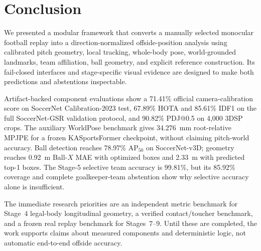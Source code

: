\documentclass[runningheads]{llncs}
\begin{document}
\section{Conclusion}
\label{sec:conclusion}

We presented a modular framework that converts a manually selected monocular football replay into a direction-normalized offside-position analysis using calibrated pitch geometry, local tracking, whole-body pose, world-grounded landmarks, team affiliation, ball geometry, and explicit reference construction. Its fail-closed interfaces and stage-specific visual evidence are designed to make both predictions and abstentions inspectable.

Artifact-backed component evaluations show a 71.41\% official camera-calibration score on SoccerNet Calibration-2023 test, 67.89\% HOTA and 85.61\% IDF1 on the full SoccerNet-GSR validation protocol, and 90.82\% PDJ@0.5 on 4,000 3DSP crops. The auxiliary WorldPose benchmark gives 34.276~mm root-relative MPJPE for a frozen KASportsFormer checkpoint, without claiming pitch-world accuracy. Ball detection reaches 78.97\% AP$_{50}$ on SoccerNet-v3D; geometry reaches 0.92~m Ball-$X$ MAE with optimized boxes and 2.33~m with predicted top-1 boxes. The Stage-5 selective team accuracy is 99.81\%, but its 85.92\% coverage and complete goalkeeper-team abstention show why selective accuracy alone is insufficient.

The immediate research priorities are an independent metric benchmark for Stage~4 legal-body longitudinal geometry, a verified contact/toucher benchmark, and a frozen real replay benchmark for Stages~7--9. Until these are completed, the work supports claims about measured components and deterministic logic, not automatic end-to-end offside accuracy.




% 
% 
\end{document}
